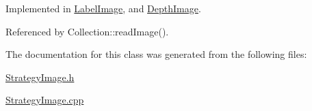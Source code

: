 Implemented in \hyperlink{classLabelImage_a1adf267dcf7b64f1ef085e434edae7a0}{Label\+Image}, and \hyperlink{classDepthImage_a07e7b06393e869a1cc3c5b39d2dcdad0}{Depth\+Image}.



Referenced by Collection\+::read\+Image().



The documentation for this class was generated from the following files\+:\begin{DoxyCompactItemize}
\item 
\hyperlink{StrategyImage_8h}{Strategy\+Image.\+h}\item 
\hyperlink{StrategyImage_8cpp}{Strategy\+Image.\+cpp}\end{DoxyCompactItemize}
